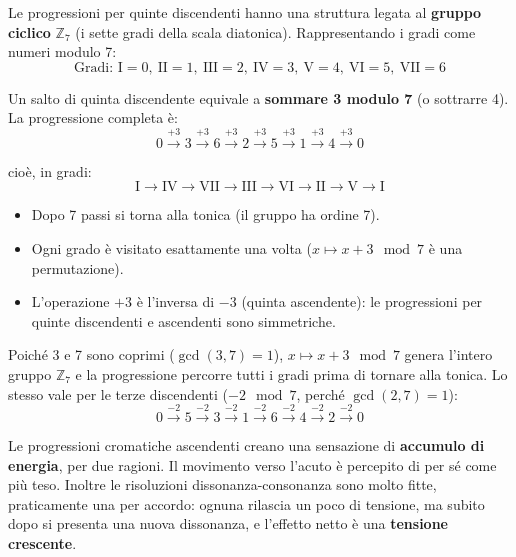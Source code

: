 \begin{matematica}
	\label{math:gruppo_z7}
	Le progressioni per quinte discendenti hanno una struttura legata al \textbf{gruppo ciclico} $\mathbb{Z}_7$ (i sette gradi della scala diatonica). Rappresentando i gradi come numeri modulo 7:
	\[
	\text{Gradi: I}=0,\ \text{II}=1,\ \text{III}=2,\ \text{IV}=3,\ \text{V}=4,\ \text{VI}=5,\ \text{VII}=6
	\]

	Un salto di quinta discendente equivale a \textbf{sommare 3 modulo 7} (o sottrarre 4). La progressione completa è:
	\[
	0 \xrightarrow{+3} 3 \xrightarrow{+3} 6 \xrightarrow{+3} 2 \xrightarrow{+3} 5 \xrightarrow{+3} 1 \xrightarrow{+3} 4 \xrightarrow{+3} 0
	\]

	cioè, in gradi:
	\[
	\text{I} \rightarrow \text{IV} \rightarrow \text{VII} \rightarrow \text{III} \rightarrow \text{VI} \rightarrow \text{II} \rightarrow \text{V} \rightarrow \text{I}
	\]

	\begin{itemize}
		\item Dopo 7 passi si torna alla tonica (il gruppo ha ordine 7).
		\item Ogni grado è visitato esattamente una volta ($x \mapsto x+3 \mod 7$ è una permutazione).
		\item L'operazione $+3$ è l'inversa di $-3$ (quinta ascendente): le progressioni per quinte discendenti e ascendenti sono simmetriche.
	\end{itemize}

	Poiché 3 e 7 sono coprimi ($\gcd(3,7) = 1$), $x \mapsto x+3 \mod 7$ genera l'intero gruppo $\mathbb{Z}_7$ e la progressione percorre tutti i gradi prima di tornare alla tonica. Lo stesso vale per le terze discendenti ($-2 \mod 7$, perché $\gcd(2,7) = 1$):
	\[
	0 \xrightarrow{-2} 5 \xrightarrow{-2} 3 \xrightarrow{-2} 1 \xrightarrow{-2} 6 \xrightarrow{-2} 4 \xrightarrow{-2} 2 \xrightarrow{-2} 0
	\]
\end{matematica}

\begin{fisica}
	\label{phys:energia_ascendenti}
	Le progressioni cromatiche ascendenti creano una sensazione di \textbf{accumulo di energia}, per due ragioni. Il movimento verso l'acuto è percepito di per sé come più teso. Inoltre le risoluzioni dissonanza-consonanza sono molto fitte, praticamente una per accordo: ognuna rilascia un poco di tensione, ma subito dopo si presenta una nuova dissonanza, e l'effetto netto è una \textbf{tensione crescente}.
\end{fisica}

